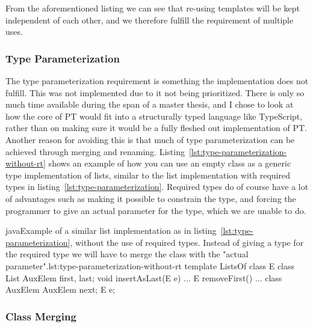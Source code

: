 From the aforementioned listing we can see that re-using templates will be kept independent of each other, and we therefore fulfill the requirement of multiple uses.

\subsubsection{Type Parameterization}\label{subsubsec:pts-type-parameterization}

The type parameterization requirement is something the implementation does not fulfill.
This was not implemented due to it not being prioritized.
There is only so much time available during the span of a master thesis, and I chose to look at how the core of PT would fit into a structurally typed language like TypeScript, rather than on making sure it would be a fully fleshed out implementation of PT\@.
Another reason for avoiding this is that much of type parameterization can be achieved through merging and renaming.
Listing~\vref{lst:type-parameterization-without-rt} shows an example of how you can use an empty class as a generic type implementation of lists, similar to the list implementation with required types in listing~\vref{lst:type-parameterization}.
Required types do of course have a lot of advantages such as making it possible to constrain the type, and forcing the programmer to give an actual parameter for the type, which we are unable to do.

\begin{code}{java}{Example of a similar list implementation as in listing~\vref{lst:type-parameterization}, without the use of required types. Instead of giving a type for the required type we will have to merge the class  with the "actual parameter".}{lst:type-parameterization-without-rt}
    template ListsOf {
        class E { }
        class List {
            AuxElem first, last;
            void insertAsLast(E e) { ... }
            E removeFirst() { ... }
        }
        class AuxElem {
            AuxElem next;
            E e;
        }
    }
\end{code}

\subsubsection{Class Merging}\label{subsubsec:pts-class-merging}

